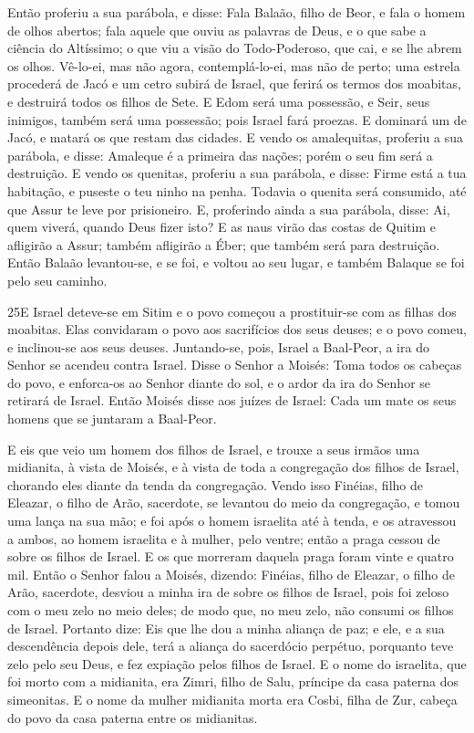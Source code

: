 Então proferiu a sua parábola, e disse: Fala Balaão, filho de
Beor, e fala o homem de olhos abertos; fala aquele que ouviu
as palavras de Deus, e o que sabe a ciência do Altíssimo; o que viu
a visão do Todo-Poderoso, que cai, e se lhe abrem os olhos.
Vê-lo-ei, mas não agora, contemplá-lo-ei, mas não de perto;
uma estrela procederá de Jacó e um cetro subirá de Israel, que
ferirá os termos dos moabitas, e destruirá todos os filhos de Sete.
E Edom será uma possessão, e Seir, seus inimigos, também será
uma possessão; pois Israel fará proezas. E dominará um de
Jacó, e matará os que restam das cidades. E vendo os
amalequitas, proferiu a sua parábola, e disse: Amaleque é a primeira
das nações; porém o seu fim será a destruição. E vendo os
quenitas, proferiu a sua parábola, e disse: Firme está a tua
habitação, e puseste o teu ninho na penha. Todavia o quenita
será consumido, até que Assur te leve por prisioneiro. E,
proferindo ainda a sua parábola, disse: Ai, quem viverá, quando Deus
fizer isto? E as naus virão das costas de Quitim e afligirão
a Assur; também afligirão a Éber; que também será para destruição.
Então Balaão levantou-se, e se foi, e voltou ao seu lugar, e
também Balaque se foi pelo seu caminho.

\medskip

\lettrine{25} E Israel deteve-se em Sitim e o povo começou a
prostituir-se com as filhas dos moabitas. Elas convidaram o povo
aos sacrifícios dos seus deuses; e o povo comeu, e inclinou-se aos
seus deuses. Juntando-se, pois, Israel a Baal-Peor, a ira do
Senhor se acendeu contra Israel. Disse o Senhor a Moisés: Toma
todos os cabeças do povo, e enforca-os ao Senhor diante do sol, e o
ardor da ira do Senhor se retirará de Israel. Então Moisés disse
aos juízes de Israel: Cada um mate os seus homens que se juntaram a
Baal-Peor.

E eis que veio um homem dos filhos de Israel, e trouxe a seus
irmãos uma midianita, à vista de Moisés, e à vista de toda a
congregação dos filhos de Israel, chorando eles diante da tenda da
congregação. Vendo isso Finéias, filho de Eleazar, o filho de
Arão, sacerdote, se levantou do meio da congregação, e tomou uma
lança na sua mão; e foi após o homem israelita até à tenda, e os
atravessou a ambos, ao homem israelita e à mulher, pelo ventre;
então a praga cessou de sobre os filhos de Israel. E os que
morreram daquela praga foram vinte e quatro mil. Então o
Senhor falou a Moisés, dizendo: Finéias, filho de Eleazar, o
filho de Arão, sacerdote, desviou a minha ira de sobre os filhos de
Israel, pois foi zeloso com o meu zelo no meio deles; de modo que,
no meu zelo, não consumi os filhos de Israel. Portanto dize:
Eis que lhe dou a minha aliança de paz; e ele, e a sua
descendência depois dele, terá a aliança do sacerdócio perpétuo,
porquanto teve zelo pelo seu Deus, e fez expiação pelos filhos de
Israel. E o nome do israelita, que foi morto com a midianita,
era Zimri, filho de Salu, príncipe da casa paterna dos simeonitas.
E o nome da mulher midianita morta era Cosbi, filha de Zur,
cabeça do povo da casa paterna entre os midianitas.


